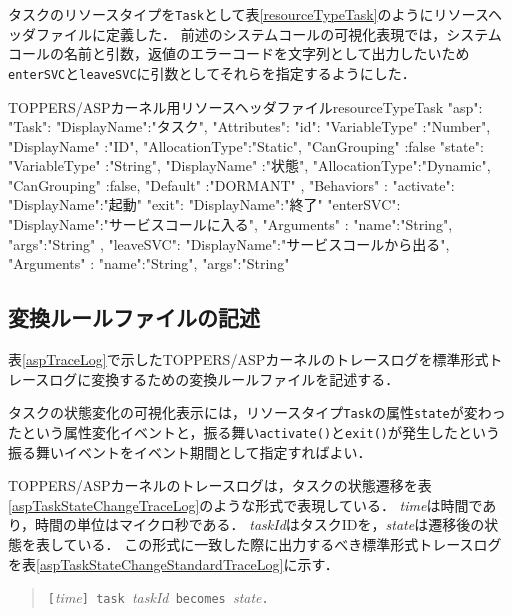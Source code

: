 タスクのリソースタイプを{\tt Task}として表\ref{resourceTypeTask}のようにリソースヘッダファイルに定義した．
前述のシステムコールの可視化表現では，システムコールの名前と引数，返値のエラーコードを文字列として出力したいため{\tt enterSVC}と{\tt leaveSVC}に引数としてそれらを指定するようにした．


\begin{FilePage}{TOPPERS/ASPカーネル用リソースヘッダファイル}{resourceTypeTask}
{
  "asp":
  {
    "Task":{
      "DisplayName":"タスク",
      "Attributes":{
        "id":{
          "VariableType"  :"Number",
          "DisplayName"   :"ID",
          "AllocationType":"Static",
          "CanGrouping"   :false
        }
        "state":{
          "VariableType"  :"String",
          "DisplayName"   :"状態",
          "AllocationType":"Dynamic",
          "CanGrouping"   :false,
          "Default"       :"DORMANT"
        }
      },
      "Behaviors"  :{
        "activate":{
          "DisplayName":"起動"
        }
        "exit":{
          "DisplayName":"終了"
        }
        "enterSVC":{
          "DisplayName":"サービスコールに入る",
          "Arguments"  :{
            "name":"String",
            "args":"String"
          }
        },
        "leaveSVC":{
          "DisplayName":"サービスコールから出る",
          "Arguments"  :{
            "name":"String",
            "args":"String"
          }
        }
      }
    }
  }
}
\end{FilePage}


\subsection{変換ルールファイルの記述}

表\ref{aspTraceLog}で示したTOPPERS/ASPカーネルのトレースログを標準形式トレースログに変換するための変換ルールファイルを記述する．

タスクの状態変化の可視化表示には，リソースタイプ{\tt Task}の属性{\tt state}が変わったという属性変化イベントと，振る舞い{\tt activate()}と{\tt exit()}が発生したという振る舞いイベントをイベント期間として指定すればよい．

TOPPERS/ASPカーネルのトレースログは，タスクの状態遷移を表\ref{aspTaskStateChangeTraceLog}のような形式で表現している．
{\it time}は時間であり，時間の単位はマイクロ秒である．
{\it taskId}はタスクIDを，{\it state}は遷移後の状態を表している．
この形式に一致した際に出力するべき標準形式トレースログを表\ref{aspTaskStateChangeStandardTraceLog}に示す．

\begin{table}[p]
\begin{quote}
\caption{TOPPERS/ASPカーネルのトレースログにおけるタスクの状態遷移を表す形式}
\label{aspTaskStateChangeTraceLog}
\begin{breakbox}
{\tt [}{\it time}{\tt ] task }{\it taskId}{\tt \ becomes }{\it state}{\tt .}
\end{breakbox}
\end{quote}
\end{table}

